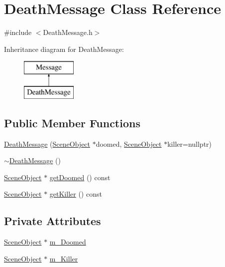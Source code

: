 \hypertarget{class_death_message}{}\section{Death\+Message Class Reference}
\label{class_death_message}


{\ttfamily \#include $<$Death\+Message.\+h$>$}

Inheritance diagram for Death\+Message\+:\begin{figure}[H]
\begin{center}
\leavevmode
\includegraphics[height=2.000000cm]{class_death_message}
\end{center}
\end{figure}
\subsection*{Public Member Functions}
\begin{DoxyCompactItemize}
\item 
\hyperlink{class_death_message_a921f4cad06cfdd3027128d4a7c9e6337}{Death\+Message} (\hyperlink{class_scene_object}{Scene\+Object} $\ast$doomed, \hyperlink{class_scene_object}{Scene\+Object} $\ast$killer=nullptr)
\item 
\hyperlink{class_death_message_a90e7cb9fe52f52a5d968f95683e0a740}{$\sim$\+Death\+Message} ()
\item 
\hyperlink{class_scene_object}{Scene\+Object} $\ast$ \hyperlink{class_death_message_a3a8862fc0961077bc45345f56aa1c9ce}{get\+Doomed} () const 
\item 
\hyperlink{class_scene_object}{Scene\+Object} $\ast$ \hyperlink{class_death_message_a0451c68fe223c3d13e4d4e3c4c55bf8e}{get\+Killer} () const 
\end{DoxyCompactItemize}
\subsection*{Private Attributes}
\begin{DoxyCompactItemize}
\item 
\hyperlink{class_scene_object}{Scene\+Object} $\ast$ \hyperlink{class_death_message_a34cafaafa984ec952e2cb23dc5de64b5}{m\+\_\+\+Doomed}
\item 
\hyperlink{class_scene_object}{Scene\+Object} $\ast$ \hyperlink{class_death_message_a34e6b366368536231d282a6934042b73}{m\+\_\+\+Killer}
\end{DoxyCompactItemize}


